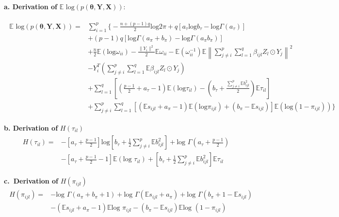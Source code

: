 \documentclass[
]{book}
\begin{document}
\textbf{a. Derivation of} \(\mathbb{E} \text{ log}(p(\boldsymbol{\theta,Y,X}))\):

\begin{align*}
\begin{split}
\mathbb{E} \text{ log}(p(\boldsymbol{\theta,Y,X})) 
= & \sum_{i=1}^p 
\biggl \{
-\frac{n + (p-1)q}{2} \text{log} 2\pi
+ q \left[
a_\tau \text{log}b_\tau -  \text{log} \Gamma(a_\tau)
\right]  \\
& + (p-1)q \left[
 \text{log} \Gamma(a_\pi + b_\pi)
 -\text{log} \Gamma(a_\pi b_\pi)
\right] \\ 
& + \frac{n}{2} \mathbb{E}(\text{log}\omega_{ii})
-\frac{\|Y_i\|^2}{2} \mathbb{E}\omega_{ii}
-\mathbb{E}(\omega_{ii}^{-1}) \mathbb{E}
\left\|
\sum_{j \neq i}^p \sum_{l=1}^q \beta_{ijl} Z_l \odot Y_j
\right \|^2 \\
& - Y_i^T \left(\sum_{j \neq i}^p \sum_{l=1}^q \mathbb{E} \beta_{ijl} Z_l \odot Y_j
\right) \\
& + \sum_{l=1}^q
\left[
\left(
\frac{p-1}{2} + a_\tau-1
\right) \mathbb{E} \left(\text{log} \tau_{il}
\right) -
\left(
b_\tau + \frac{\sum_{j \neq i}^p \mathbb{E}b_{ijl}^2}{2} \right)  \mathbb{E}
\tau_{il}
\right] \\
& + \sum_{j \neq i}^p \sum_{l=1}^q \left[
\left(
\mathbb{E}s_{ijl}+a_\pi - 1
\right) \mathbb{E} (\text{log} \pi_{ijl}) + (b_\pi - \mathbb{E}s_{ijl})
\right] \mathbb{E} \left(\text{log} (1-\pi_{ijl})
\right)
\biggl \}
\end{split}
\end{align*}

\textbf{b. Derivation of} \(H(\tau_{il})\)
\begin{align*}
\begin{split}
H(\tau_{il}) = & - \left[a_\tau+\frac{p-1}{2}\right] \text{log}\left[b_\tau + \frac{1}{2}\sum_{j \neq i} ^p\mathbb{E}b_{ijl}^2\right] + \text{log } \Gamma(a_\tau+\frac{p-1}{2}) \\
& - \left[a_\tau+\frac{p-1}{2} -1 \right] \mathbb{E}(\text{log }\tau_{il})
+ \left[b_\tau + \frac{1}{2}\sum_{j \neq i} ^p\mathbb{E}b_{ijl}^2\right] \mathbb{E}\tau_{il}
\end{split}
\end{align*}

\textbf{c.~Derivation of} \(H(\pi_{ijl})\)
\begin{align*}
\begin{split}
H(\pi_{ijl}) = 
& - \text{log }\Gamma(a_\pi+b_\pi+1) 
+ \text{log }
\Gamma(\mathbb{E}s_{ijl} + a_\pi) + \text{log }
\Gamma(b_\pi + 1 - \mathbb{E}s_{ijl}) \\
& - (\mathbb{E}s_{ijl} + a_\pi -1) \mathbb{E} \text{log } \pi_{ijl}
- (b_\pi - \mathbb{E}s_{ijl}) \mathbb{E} \text{log } (1-\pi_{ijl})
\end{split}
\end{align*}
\end{document}
